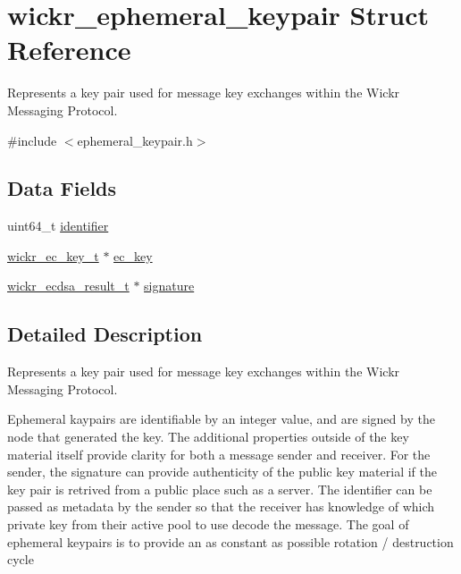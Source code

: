 \hypertarget{structwickr__ephemeral__keypair}{}\section{wickr\+\_\+ephemeral\+\_\+keypair Struct Reference}
\label{structwickr__ephemeral__keypair}


Represents a key pair used for message key exchanges within the Wickr Messaging Protocol.  




{\ttfamily \#include $<$ephemeral\+\_\+keypair.\+h$>$}

\subsection*{Data Fields}
\begin{DoxyCompactItemize}
\item 
uint64\+\_\+t \mbox{\hyperlink{structwickr__ephemeral__keypair_a9220b37a7db764818406bcc84e3ba86b}{identifier}}
\item 
\mbox{\hyperlink{structwickr__ec__key}{wickr\+\_\+ec\+\_\+key\+\_\+t}} $\ast$ \mbox{\hyperlink{structwickr__ephemeral__keypair_ad730ed9ba92e05d0a271edc838e548fe}{ec\+\_\+key}}
\item 
\mbox{\hyperlink{structwickr__ecdsa__result}{wickr\+\_\+ecdsa\+\_\+result\+\_\+t}} $\ast$ \mbox{\hyperlink{structwickr__ephemeral__keypair_aea420be2397d798a560fa973be86228c}{signature}}
\end{DoxyCompactItemize}


\subsection{Detailed Description}
Represents a key pair used for message key exchanges within the Wickr Messaging Protocol. 

Ephemeral kaypairs are identifiable by an integer value, and are signed by the node that generated the key. The additional properties outside of the key material itself provide clarity for both a message sender and receiver. For the sender, the signature can provide authenticity of the public key material if the key pair is retrived from a public place such as a server. The identifier can be passed as metadata by the sender so that the receiver has knowledge of which private key from their active pool to use decode the message. The goal of ephemeral keypairs is to provide an as constant as possible rotation / destruction cycle 

